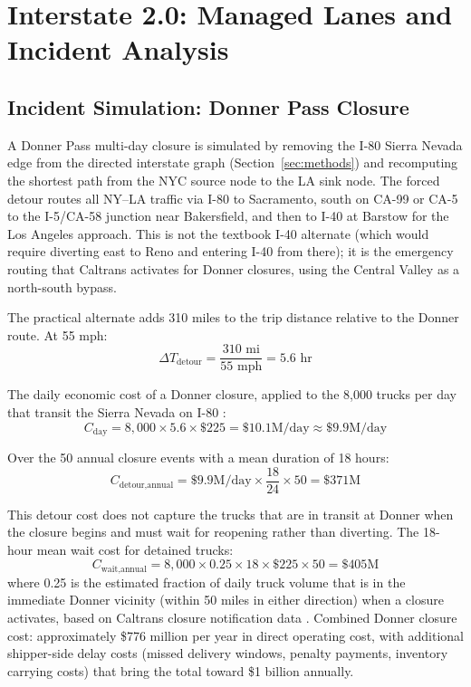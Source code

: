 \section{Interstate 2.0: Managed Lanes and Incident Analysis}
\label{sec:i2scenario}

\subsection{Incident Simulation: Donner Pass Closure}

A Donner Pass multi-day closure is simulated by removing the I-80 Sierra Nevada edge from the directed interstate graph (Section~\ref{sec:methods}) and recomputing the shortest path from the NYC source node to the LA sink node. The forced detour routes all NY--LA traffic via I-80 to Sacramento, south on CA-99 or CA-5 to the I-5/CA-58 junction near Bakersfield, and then to I-40 at Barstow for the Los Angeles approach. This is not the textbook I-40 alternate (which would require diverting east to Reno and entering I-40 from there); it is the emergency routing that Caltrans activates for Donner closures, using the Central Valley as a north-south bypass.

The practical alternate adds 310 miles to the trip distance relative to the Donner route. At 55 mph:
\begin{equation}
  \Delta T_{\text{detour}} = \frac{310 \text{ mi}}{55 \text{ mph}} = 5.6 \text{ hr}
\end{equation}

The daily economic cost of a Donner closure, applied to the 8,000 trucks per day that transit the Sierra Nevada on I-80 \citep{Caltrans2023}:
\begin{equation}
  C_{\text{day}} = 8{,}000 \times 5.6 \times \$225 = \$10.1\text{M/day} \approx \$9.9\text{M/day}
\end{equation}

Over the 50 annual closure events with a mean duration of 18 hours:
\begin{equation}
  C_{\text{detour,annual}} = \$9.9\text{M/day} \times \frac{18}{24} \times 50 = \$371\text{M}
\end{equation}

This detour cost does not capture the trucks that are in transit at Donner when the closure begins and must wait for reopening rather than diverting. The 18-hour mean wait cost for detained trucks:
\begin{equation}
  C_{\text{wait,annual}} = 8{,}000 \times 0.25 \times 18 \times \$225 \times 50 = \$405\text{M}
\end{equation}
where 0.25 is the estimated fraction of daily truck volume that is in the immediate Donner vicinity (within 50 miles in either direction) when a closure activates, based on Caltrans closure notification data \citep{Caltrans2023}. Combined Donner closure cost: approximately \$776 million per year in direct operating cost, with additional shipper-side delay costs (missed delivery windows, penalty payments, inventory carrying costs) that bring the total toward \$1 billion annually.

